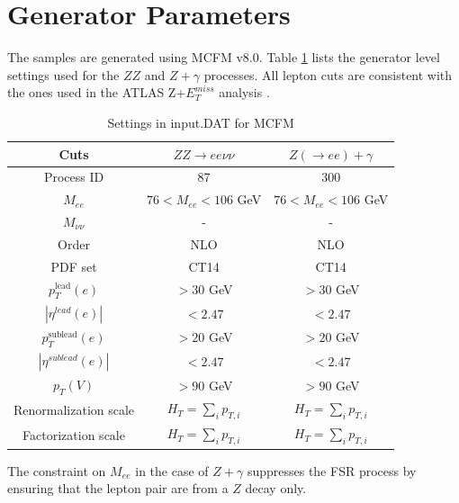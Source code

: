 \documentclass[11pt,a4paper,openright,twoside]{report}
\begin{document}
\section{Generator Parameters}
The samples are generated using MCFM v8.0.
\renewcommand{\thefootnote}{\fnsymbol{footnote}} 
Table \ref{table:default} lists the generator level settings used for the $ZZ$ and $Z+\gamma$ processes. All lepton cuts are consistent with the ones used in the ATLAS Z+$E_T^{miss}$ analysis \cite{ZH_ATLAS}.
\begin{table}[H]
\begin{center}
	\begin{tabular}{|c|c|c|}
	\hline
	\textbf{Cuts} &$ZZ \rightarrow ee\nu\nu$ & $Z(\rightarrow ee)+\gamma$\\
	\hline
	Process ID & 87 & 300\\
	$M_{ee}$ & $76 < M_{ee} < 106$ GeV & $76 < M_{ee} < 106$ GeV\\
	$M_{\nu\nu}$ & - & -\\
	Order & NLO & NLO\\
	PDF set & CT14 & CT14\\
	$p_T^{\text{lead}}(e)$ & $> 30$ GeV & $> 30$ GeV\\
	$|\eta^{lead}(e)|$ & $< 2.47$ & $< 2.47$\\
	$p_T^{\text{sublead}}(e)$ & $> 20$ GeV & $> 20$ GeV\\
	$|\eta^{sublead}(e)|$ & $< 2.47$ & $< 2.47$\\
	$p_T(V)$\footnotemark & $> 90$ GeV & $> 90$ GeV\\
	Renormalization scale & $H_T = \sum_i p_{T,i}$& $H_T = \sum_i p_{T,i}$\\
	Factorization scale & $H_T = \sum_i p_{T,i}$& $H_T = \sum_i p_{T,i}$\\
	\hline
	\end{tabular}
	\caption{Settings in input.DAT for MCFM}
	\label{table:default}
	\end{center}
\end{table}
\renewcommand{\thefootnote}{\arabic{footnote}}
The constraint on $M_{ee}$ in the case of $Z+\gamma$ suppresses the FSR process by ensuring that the lepton pair are from a $Z$ decay only.
\newpage
\end{document}
